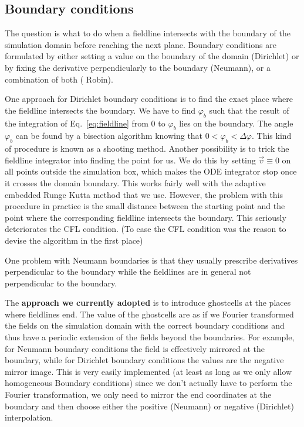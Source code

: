 \subsection{Boundary conditions} \label{sec:boundary}
The question is what to do when a fieldline intersects with the boundary
of the simulation domain before reaching the next plane.
Boundary conditions are formulated by either setting a value
on the boundary of the domain (Dirichlet) or by fixing
the derivative perpendicularly to the boundary (Neumann), or
a combination of both ( Robin).

One approach for Dirichlet boundary conditions
is to find the exact place where the fieldline intersects the boundary.
We have to find
$\varphi_b$ such that the result of the integration of Eq.~\eqref{eq:fieldline} from
$0$ to $\varphi_b$ lies on the boundary.
The angle $\varphi_b$ can be found by a bisection algorithm knowing that $0<\varphi_b < \Delta\varphi$.
This kind of procedure is known as a shooting method.
Another possibility is to trick the fieldline integrator into finding the point for us.
We do this by setting $\vec v \equiv 0$ on all points outside the simulation box, which
makes the ODE integrator stop once it crosses the domain boundary.
This works fairly well with the adaptive embedded Runge Kutta method that we use.
However, the problem with this procedure in practice is the small
distance between the starting point and the point where the corresponding
fieldline intersects the boundary. This seriously deteriorates the
CFL condition. (To ease the CFL condition
was the reason to devise the algorithm in the first place)

One problem with Neumann boundaries is that they usually prescribe
derivatives perpendicular to the boundary
while the fieldlines are in general not perpendicular to the boundary.

The \textbf{approach we currently adopted} is to introduce ghostcells at the
places where fieldlines end. The value of the ghostcells are
as if we Fourier transformed the fields on the simulation domain
with the correct boundary conditions and thus have a periodic
extension of the fields beyond the boundaries.
For example, for Neumann boundary
conditions the field is effectively mirrored at the boundary, while for
Dirichlet boundary conditions the values are the negative mirror image.
This is very easily implemented (at least as long as we only allow
homogeneous Boundary conditions) since we don't actually have to
perform the Fourier transformation, we only need to mirror the end
coordinates at the boundary and then choose either the positive (Neumann) or
negative (Dirichlet) interpolation.

